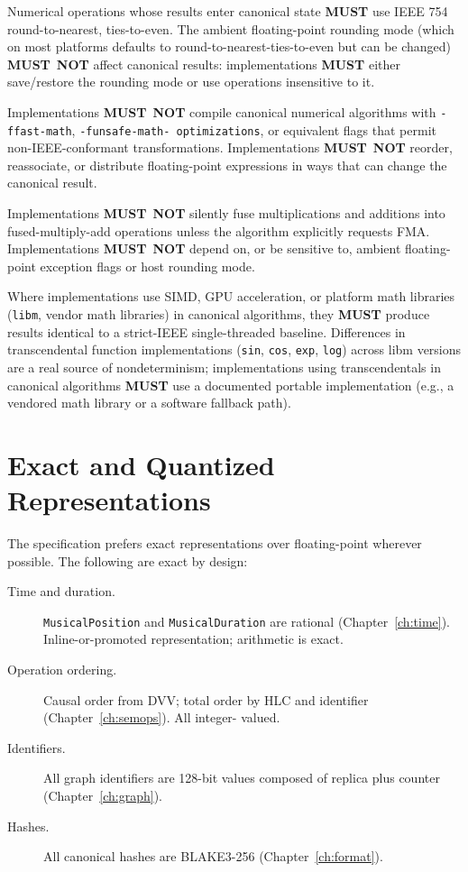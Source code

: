 \documentclass[11pt,letterpaper]{report}
\newcounter{requirement}[chapter]
\newcommand{\MUST}{\textbf{MUST}}
\newcommand{\MUSTNOT}{\textbf{MUST}\nobreak\ \textbf{NOT}}
\begin{document}
\begin{requirement}
  \label{req:determinism:floating-point-execution}
  Numerical operations whose results enter canonical state
  \MUST{} use IEEE 754 round-to-nearest, ties-to-even. The
  ambient floating-point rounding mode (which on most platforms
  defaults to round-to-nearest-ties-to-even but can be changed)
  \MUSTNOT{} affect canonical results: implementations \MUST{}
  either save/restore the rounding mode or use operations
  insensitive to it.

  Implementations \MUSTNOT{} compile canonical numerical
  algorithms with \texttt{-ffast-math}, \texttt{-funsafe-math-
  optimizations}, or equivalent flags that permit
  non-IEEE-conformant transformations. Implementations \MUSTNOT{}
  reorder, reassociate, or distribute floating-point expressions
  in ways that can change the canonical result.

  Implementations \MUSTNOT{} silently fuse multiplications and
  additions into fused-multiply-add operations unless the
  algorithm explicitly requests FMA. Implementations \MUSTNOT{}
  depend on, or be sensitive to, ambient floating-point exception
  flags or host rounding mode.

  Where implementations use SIMD, GPU acceleration, or platform
  math libraries (\texttt{libm}, vendor math libraries) in
  canonical algorithms, they \MUST{} produce results identical
  to a strict-IEEE single-threaded baseline. Differences in
  transcendental function implementations (\texttt{sin},
  \texttt{cos}, \texttt{exp}, \texttt{log}) across libm versions
  are a real source of nondeterminism; implementations using
  transcendentals in canonical algorithms \MUST{} use a
  documented portable implementation (e.g., a vendored math
  library or a software fallback path).
\end{requirement}

\section{Exact and Quantized Representations}
\label{sec:det:exact}

The specification prefers exact representations over
floating-point wherever possible. The following are exact by
design:

\begin{description}
  \item[Time and duration.] \texttt{MusicalPosition} and
    \texttt{MusicalDuration} are rational
    (Chapter~\ref{ch:time}). Inline-or-promoted representation;
    arithmetic is exact.
  \item[Operation ordering.] Causal order from DVV; total order
    by HLC and identifier (Chapter~\ref{ch:semops}). All integer-
    valued.
  \item[Identifiers.] All graph identifiers are 128-bit values
    composed of replica plus counter (Chapter~\ref{ch:graph}).
  \item[Hashes.] All canonical hashes are BLAKE3-256
    (Chapter~\ref{ch:format}).
\end{description}
\end{document}
